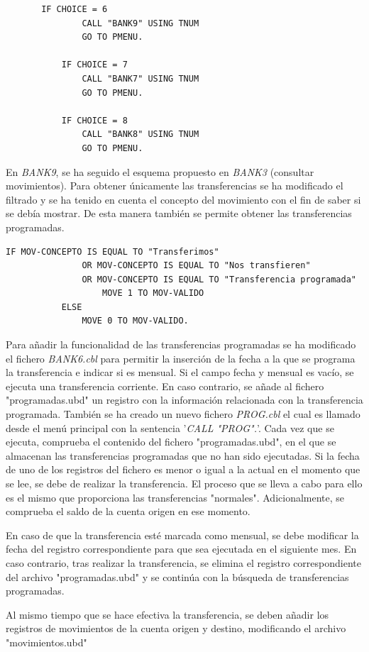 \documentclass[10pt,a4paper]{article}
\begin{document}
\begin{lstlisting}
	   IF CHOICE = 6 
               CALL "BANK9" USING TNUM
               GO TO PMENU.

           IF CHOICE = 7
               CALL "BANK7" USING TNUM
               GO TO PMENU.

           IF CHOICE = 8
               CALL "BANK8" USING TNUM
               GO TO PMENU.
\end{lstlisting}

En \emph{BANK9}, se ha seguido el esquema propuesto en \emph{BANK3} (consultar movimientos).
Para obtener únicamente las transferencias se ha modificado el filtrado y se ha tenido en cuenta el concepto del movimiento con el fin de saber si se debía mostrar. De esta manera también se permite obtener las transferencias programadas.
\\

\begin{lstlisting}
IF MOV-CONCEPTO IS EQUAL TO "Transferimos" 
               OR MOV-CONCEPTO IS EQUAL TO "Nos transfieren"
               OR MOV-CONCEPTO IS EQUAL TO "Transferencia programada"
                   MOVE 1 TO MOV-VALIDO
           ELSE 
               MOVE 0 TO MOV-VALIDO. 
\end{lstlisting}
\newpage
Para añadir la funcionalidad de las transferencias programadas se ha modificado el fichero \textit{BANK6.cbl} para permitir la inserción de la fecha a la que se programa la transferencia e indicar si es mensual. Si el campo fecha y mensual es vacío, se ejecuta una transferencia corriente. En caso contrario, se añade al fichero "programadas.ubd" un registro con la información relacionada con la transferencia programada. También se ha creado un nuevo fichero \emph{PROG.cbl} el cual es llamado desde el menú principal con la sentencia '\emph{CALL "PROG".}'. Cada vez que se ejecuta, comprueba el contenido del fichero "programadas.ubd", en el que se almacenan las transferencias programadas que no han sido ejecutadas. Si la fecha de uno de los registros del fichero es menor o igual a la actual en el momento que se lee, se debe de realizar la transferencia. El proceso que se lleva a cabo para ello es el mismo que proporciona las transferencias "normales". Adicionalmente, se comprueba el saldo de la cuenta origen en ese momento. \par
En caso de que la transferencia esté marcada como mensual, se debe modificar la fecha del registro correspondiente para que sea ejecutada en el siguiente mes. En caso contrario, tras realizar la transferencia, se elimina el registro correspondiente del archivo "programadas.ubd" y se continúa con la búsqueda de transferencias programadas. \par
Al mismo tiempo que se hace efectiva la transferencia, se deben añadir los registros de movimientos de la cuenta origen y destino, modificando el archivo "movimientos.ubd"
\end{document}
